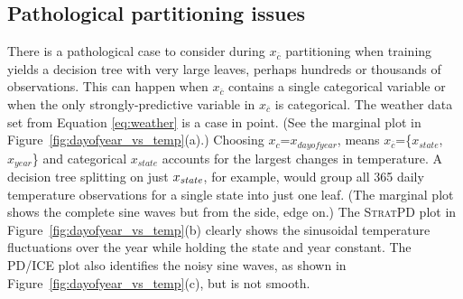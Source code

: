 \documentclass[12pt]{article}
\newcommand{\figref}[1]{Figure~\ref{#1}}
\newcommand{\spd}{\fontfamily{cmr}\textsc{\small StratPD}}
\newcommand{\xnc}{$x_{\overline{c}}$}
\begin{document}
\subsection{Pathological partitioning issues}

There is a pathological case to consider during \xnc{} partitioning when training yields a decision tree with very large leaves, perhaps hundreds or thousands of observations.  This can happen when \xnc{} contains a single categorical variable or when the only strongly-predictive variable in \xnc{} is categorical.  The weather data set from Equation \ref{eq:weather} is a case in point. (See the marginal plot in \figref{fig:dayofyear_vs_temp}(a).) Choosing $x_c$=$x_{dayofyear}$, means \xnc{}=\{$x_{state}$,$x_{year}$\} and categorical $x_{state}$ accounts for the largest changes in temperature.   A decision tree splitting on just $x_{\it state}$, for example, would group all 365 daily temperature observations for a single state into just one leaf. (The marginal plot shows the complete sine waves but from the side, edge on.)   The \spd{} plot in \figref{fig:dayofyear_vs_temp}(b) clearly shows the sinusoidal temperature fluctuations over the year while holding the state and year constant. The PD/ICE plot also identifies the noisy sine waves, as shown in \figref{fig:dayofyear_vs_temp}(c), but is not smooth.
\end{document}
